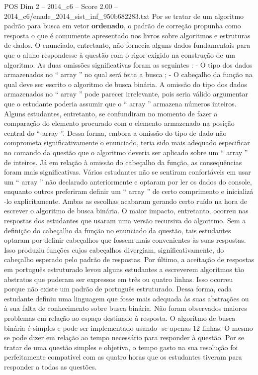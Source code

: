 \begin{textsample}{POS Dim 2 – 2014\_c6 – Score 2.00 – 2014\_c6/enade\_2014\_sist\_inf\_950b682283.txt}
Por se tratar de um algoritmo padrão para busca em vetor \textbf{ordenado}, o padrão de correção propunha como resposta o que é comumente apresentado nos livros sobre algoritmos e estruturas de dados.
O enunciado, entretanto, não fornecia alguns dados fundamentais para que o aluno respondesse à questão com o rigor exigido na construção de um algoritmo.
As duas omissões significativas foram as seguintes : - O tipo dos dados armazenados no “ array ” no qual será feita a busca ; - O cabeçalho da função na qual deve ser escrito o algoritmo de busca binária.
A omissão do tipo dos dados armazenados no “ array ” pode parecer irrelevante, pois seria válido argumentar que o estudante poderia assumir que o “ array ” armazena números inteiros.
Alguns estudantes, entretanto, se confundiram no momento de fazer a comparação do elemento procurado com o elemento armazenado na posição central do “ array ”.
Dessa forma, embora a omissão do tipo de dado não comprometa significativamente o enunciado, teria sido mais adequado especificar no comando da questão que o algoritmo deveria ser aplicado sobre um “ array ” de inteiros.
Já em relação à omissão do cabeçalho da função, as consequências foram mais significativas.
Vários estudantes não se sentiram confortáveis em usar um “ array ” não declarado anteriormente e optaram por ler os dados do console, enquanto outros preferiram definir um “ array ” de certo comprimento e inicializá -lo explicitamente.
Ambas as escolhas acabaram gerando certo ruído na hora de escrever o algoritmo de busca binária.
O maior impacto, entretanto, ocorreu nas respostas dos estudantes que usaram uma versão recursiva do algoritmo.
Sem a definição do cabeçalho da função no enunciado da questão, tais estudantes optaram por definir cabeçalhos que fossem mais convenientes às suas respostas.
Isso produziu funções cujos cabeçalhos divergiam, significativamente, do cabeçalho esperado pelo padrão de respostas.
Por último, a aceitação de respostas em português estruturado levou alguns estudantes a escreverem algoritmos tão abstratos que puderam ser expressos em três ou quatro linhas.
Isso ocorreu porque não existe um padrão de português estruturado.
Dessa forma, cada estudante definiu uma linguagem que fosse mais adequada às suas abstrações ou à sua falta de conhecimento sobre busca binária.
Não foram observados maiores problemas em relação ao espaço destinado à resposta.
O algoritmo de busca binária é simples e pode ser implementado usando -se apenas 12 linhas.
O mesmo se pode dizer em relação ao tempo necessário para responder à questão.
Por se tratar de uma questão simples e objetiva, o tempo gasto na sua resolução foi perfeitamente compatível com as quatro horas que os estudantes tiveram para responder a todas as questões.

\end{textsample}
